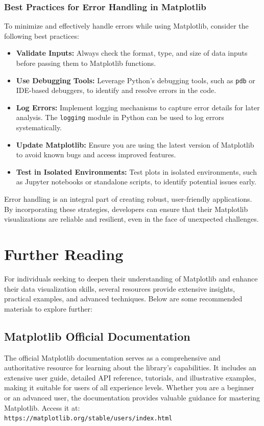 \subsubsection{Best Practices for Error Handling in Matplotlib}

To minimize and effectively handle errors while using Matplotlib, consider the following best practices:
\begin{itemize}
	\item \textbf{Validate Inputs:} Always check the format, type, and size of data inputs before passing them to Matplotlib functions.
	\item \textbf{Use Debugging Tools:} Leverage Python’s debugging tools, such as \texttt{pdb} or IDE-based debuggers, to identify and resolve errors in the code.
	\item \textbf{Log Errors:} Implement logging mechanisms to capture error details for later analysis. The \texttt{logging} module in Python can be used to log errors systematically.
	\item \textbf{Update Matplotlib:} Ensure you are using the latest version of Matplotlib to avoid known bugs and access improved features.
	\item \textbf{Test in Isolated Environments:} Test plots in isolated environments, such as Jupyter notebooks or standalone scripts, to identify potential issues early.
\end{itemize}

Error handling is an integral part of creating robust, user-friendly applications. By incorporating these strategies, developers can ensure that their Matplotlib visualizations are reliable and resilient, even in the face of unexpected challenges.


\section{Further Reading}

For individuals seeking to deepen their understanding of Matplotlib and enhance their data visualization skills, several resources provide extensive insights, practical examples, and advanced techniques. Below are some recommended materials to explore further:

\subsection{Matplotlib Official Documentation}
The official Matplotlib documentation serves as a comprehensive and authoritative resource for learning about the library's capabilities. It includes an extensive user guide, detailed API reference, tutorials, and illustrative examples, making it suitable for users of all experience levels. Whether you are a beginner or an advanced user, the documentation provides valuable guidance for mastering Matplotlib. Access it at: \\
\texttt{https://matplotlib.org/stable/users/index.html}

